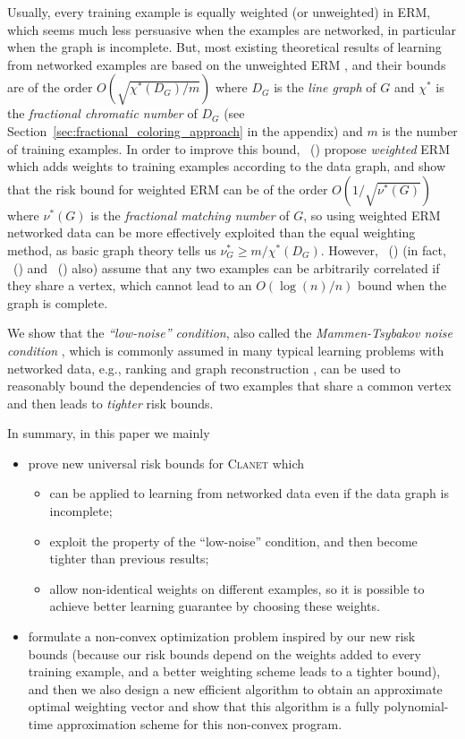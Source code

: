 \documentclass[letterpaper]{article} %
\newcommand{\problemabbr}{\textnormal{C}\textsc{lanet}}
\newcommand{\citet}[1]{\citeauthor{#1}\ (\citeyear{#1})}
\begin{document}
Usually, every training example is equally weighted (or unweighted) in ERM, which seems much less persuasive when the examples are networked, in particular when the graph is incomplete. But, most existing theoretical results of learning from networked examples are based on the unweighted ERM \cite{Usunier2005,ralaivola2009chromatic}, and their bounds are of the order $O(\sqrt{\chi^*(D_G)/m})$ where $D_G$ is the \emph{line graph} of $G$ and $\chi^*$ is the \emph{fractional chromatic number} of $D_G$ (see Section~\ref{sec:fractional_coloring_approach} in the appendix) and $m$ is the number of training examples. 
In order to improve this bound, \citet{wang2017learning} propose \emph{weighted} ERM %
which adds weights to training examples 
according to the data graph, and show that the risk bound for weighted ERM can be of the order $O(1/\sqrt{\nu^*(G)})$ where $\nu^*(G)$ is the \emph{fractional matching number} of $G$, so using weighted ERM networked data can be more effectively exploited than the equal weighting method, as basic graph theory tells us $\nu^*_G\ge m / \chi^*(D_G)$. 
However, \citet{wang2017learning} (in fact, \citet{Usunier2005} and \citet{ralaivola2009chromatic} also) assume that any two examples can be arbitrarily correlated if they share a vertex, which cannot lead to an $O(\log(n)/n)$ bound when the graph is complete. 

We show that the \emph{``low-noise'' condition}, also called the \emph{Mammen-Tsybakov noise condition}  \cite{Mammen1998Smooth}, which is commonly assumed in many typical learning problems with networked data, e.g., ranking \cite{clemenccon2008ranking} and graph reconstruction \cite{papa2016graph}, can be used to reasonably bound the dependencies of two examples that share a common vertex and then leads to \emph{tighter} risk bounds. 

In summary, in this paper we mainly 
\begin{itemize}
\item prove new universal risk bounds for \problemabbr{} which
\begin{itemize}
\item can be applied to learning from networked data even if the data graph is incomplete; 
\item exploit the property of the ``low-noise'' condition, and then become tighter than previous results; 
\item allow non-identical weights on different examples, so it is possible to achieve better learning guarantee by choosing these weights.
\end{itemize}
\item formulate a non-convex optimization problem inspired by our new risk bounds (because our risk bounds depend on the weights added to every training example, and a better weighting scheme leads to a tighter bound), and then we also design a new efficient algorithm to obtain an approximate optimal weighting vector and show that this algorithm is a fully polynomial-time approximation scheme for this non-convex program. 
\end{itemize}
\end{document}
